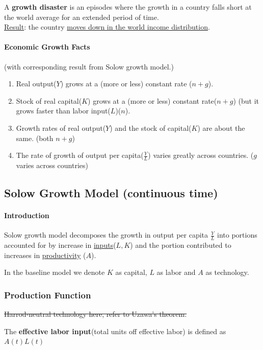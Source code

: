 \documentclass[11pt]{article}
\begin{document}
        \begin{definition}
            A \textbf{growth disaster} is an episodes where the growth in a country falls short at the world average for an extended period of time. \\
            \ul{Result}: the country \ul{moves down in the world income distribution}.
        \end{definition}
    
        \paragraph{Economic Growth Facts}(with corresponding result from Solow growth model.)
        \begin{enumerate}
            \item Real output($Y$) grows at a (more or less) constant rate ($n+g$).
            \item Stock of real capital($K$) grows at a (more or less) constant rate($n+g$) (but it grows faster than labor input($L$)($n$).
            \item Growth rates of real output($Y$) and the stock of capital($K$) are about the same. (both $n+g$)
            \item The rate of growth of output per capita($\frac{Y}{L}$) varies greatly across countries. ($g$ varies across countries)
        \end{enumerate}
        
        \subsection{Solow Growth Model (continuous time)}
            \paragraph{Introduction} Solow growth model decomposes the growth in output per capita $\frac{Y}{L}$ into portions accounted for by increase in \ul{inputs}($L, K$) and the portion contributed to increases in \ul{productivity} ($A$).
           
            \begin{notation}
            		In the baseline model we denote $K$ as capital, $L$ as labor and $A$ as technology.
            \end{notation}
            
        \subsubsection{Production Function}
            \begin{remark}
                \st{Harrod-neutral technology here, refer to Uzawa's theorem.}
            \end{remark}
            \begin{definition}
                The \textbf{effective labor input}(total units off effective labor) is defined as $A(t)L(t)$
            \end{definition}
            
\end{document}
